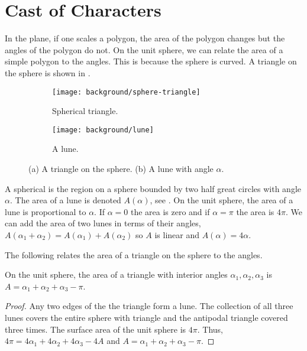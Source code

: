 \section{Cast of Characters}

In the plane, if one scales a polygon, the area of the polygon changes
but the angles of the polygon do not.
On the unit sphere, we can relate the area of a simple polygon 
to the angles. This is because the sphere is curved.
A triangle on the sphere is shown in .


 \begin{figure}[htb]
         \centering
        \begin{subfigure}[b]{0.35\textwidth}
         \texttt{[image: background/sphere-triangle]}
         \caption{Spherical triangle.}
 	 \label{fig:sphere-triangle}
       \end{subfigure}
         \hspace{1cm}
         \begin{subfigure}[b]{0.35\textwidth}
         \texttt{[image: background/lune]}
         \caption{A lune.}
          \label{fig:lune}
         \end{subfigure}
		\caption{(a) A triangle on the sphere.
 		(b) A lune with angle $\alpha$.
 		\label{fig:sphere-lune}}
 \end{figure}
A spherical  is the region on a sphere bounded by two half great circles
with angle $\alpha$. The area of a lune is denoted $A(\alpha)$,
 see .
On the unit sphere, the area of a lune is proportional to $\alpha$. 
If $\alpha=0$ the area is zero and if $\alpha=\pi$ the area is $4\pi$.
We can add the area of two lunes in terms of their angles, 
$A(\alpha_1+\alpha_2)=A(\alpha_1)+A(\alpha_2)$ so $A$ is linear
and  $A(\alpha)=4\alpha.$




The following relates the area of a triangle on the sphere to the angles.

\begin{lemma}\label{lem:spherical-triangle}
On the unit sphere, the area of a triangle with interior angles $\alpha_1, \alpha_2, \alpha_3$
is $A=\alpha_1+\alpha_2+\alpha_3-\pi$.
\end{lemma}

\begin{proof}
	Any two edges of the the triangle form a lune. The collection of 
	all three lunes covers the entire sphere with triangle and the antipodal triangle covered three times.
 	The surface area of the unit sphere is $4\pi$.
	Thus, $4\pi=4\alpha_1+4\alpha_2+4\alpha_3-4A$
	and $A=\alpha_1+\alpha_2+\alpha_3-\pi$.
\end{proof}

